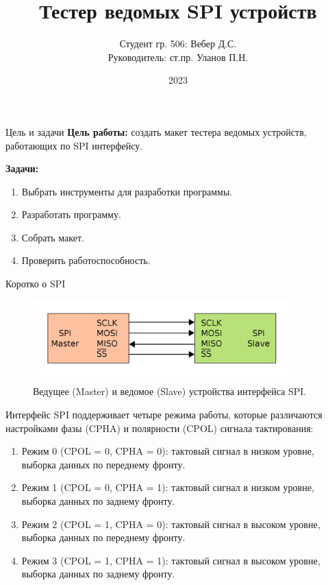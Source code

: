 \documentclass[10pt]{beamer}
\begin{document}
\title{Тестер ведомых SPI устройств}
\author{Студент гр. 506: Вебер Д.С.\\Руководитель:  ст.пр. Уланов П.Н.}
\date{2023}


\frame{\titlepage}

\begin{frame}{Цель и задачи}
  \textbf{Цель работы:} создать макет тестера ведомых устройств, работающих
по SPI интерфейсу.

  \textbf{Задачи:} 
  \begin{enumerate}
  \item Выбрать инструменты для разработки программы.
  \item Разработать программу.
  \item Собрать макет.
  \item Проверить работоспособность.
  \end{enumerate}
\end{frame}

\begin{frame}{Коротко о SPI}
  \begin{figure}
  \includegraphics[width=0.9\textwidth]{spi}
  \caption{Ведущее (Master) и ведомое (Slave) устройства интерфейса SPI.}
  \end{figure}
\begin{footnotesize}
  		Интерфейс SPI поддерживает четыре режима работы, которые различаются настройками фазы (CPHA) и полярности (CPOL) сигнала тактирования:
	\begin{enumerate}
		\item Режим 0 (CPOL = 0, CPHA = 0): тактовый сигнал в низком уровне, выборка данных по переднему фронту.
		\item Режим 1 (CPOL = 0, CPHA = 1): тактовый сигнал в низком уровне, выборка данных по заднему фронту.
		\item Режим 2 (CPOL = 1, CPHA = 0): тактовый сигнал в высоком уровне, выборка данных по переднему фронту.
		\item Режим 3 (CPOL = 1, CPHA = 1): тактовый сигнал в высоком уровне, выборка данных по заднему фронту.
	\end{enumerate}
\end{footnotesize}
\end{frame}
\end{document}
